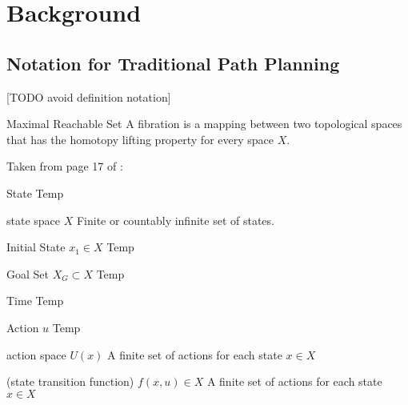 \chapter{Background}


\section{Notation for Traditional Path Planning}

[TODO avoid definition notation]
\theoremstyle{definition}
\begin{definition}{Maximal Reachable Set}
A fibration is a mapping between two topological spaces that has the homotopy lifting property for every space $X$.
\end{definition}

Taken from page 17 of \cite{lavalle2006planning}:

\begin{definition}{State}
Temp
\end{definition}

\begin{definition}{state space $X$}
Finite or countably infinite set of states.
\end{definition}

\begin{definition}{Initial State $x_1 \in X$}
Temp
\end{definition}

\begin{definition}{Goal Set $X_G \subset X$}
Temp
\end{definition}

\begin{definition}{Time}
Temp
\end{definition}

\begin{definition}{Action $u$}
Temp
\end{definition}

\begin{definition}{action space $U(x)$}
A finite set of actions for each state $x \in X$
\end{definition}

\begin{definition}{(state transition function)}
 $f(x,u) \in X$
A finite set of actions for each state $x \in X$
\end{definition}


